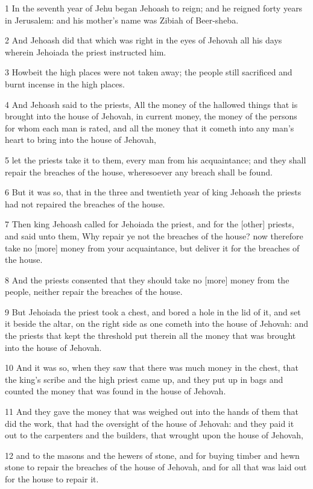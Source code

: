 \par 1 In the seventh year of Jehu began Jehoash to reign; and he reigned forty years in Jerusalem: and his mother's name was Zibiah of Beer-sheba.
\par 2 And Jehoash did that which was right in the eyes of Jehovah all his days wherein Jehoiada the priest instructed him.
\par 3 Howbeit the high places were not taken away; the people still sacrificed and burnt incense in the high places.
\par 4 And Jehoash said to the priests, All the money of the hallowed things that is brought into the house of Jehovah, in current money, the money of the persons for whom each man is rated, and all the money that it cometh into any man's heart to bring into the house of Jehovah,
\par 5 let the priests take it to them, every man from his acquaintance; and they shall repair the breaches of the house, wheresoever any breach shall be found.
\par 6 But it was so, that in the three and twentieth year of king Jehoash the priests had not repaired the breaches of the house.
\par 7 Then king Jehoash called for Jehoiada the priest, and for the [other] priests, and said unto them, Why repair ye not the breaches of the house? now therefore take no [more] money from your acquaintance, but deliver it for the breaches of the house.
\par 8 And the priests consented that they should take no [more] money from the people, neither repair the breaches of the house.
\par 9 But Jehoiada the priest took a chest, and bored a hole in the lid of it, and set it beside the altar, on the right side as one cometh into the house of Jehovah: and the priests that kept the threshold put therein all the money that was brought into the house of Jehovah.
\par 10 And it was so, when they saw that there was much money in the chest, that the king's scribe and the high priest came up, and they put up in bags and counted the money that was found in the house of Jehovah.
\par 11 And they gave the money that was weighed out into the hands of them that did the work, that had the oversight of the house of Jehovah: and they paid it out to the carpenters and the builders, that wrought upon the house of Jehovah,
\par 12 and to the masons and the hewers of stone, and for buying timber and hewn stone to repair the breaches of the house of Jehovah, and for all that was laid out for the house to repair it.

